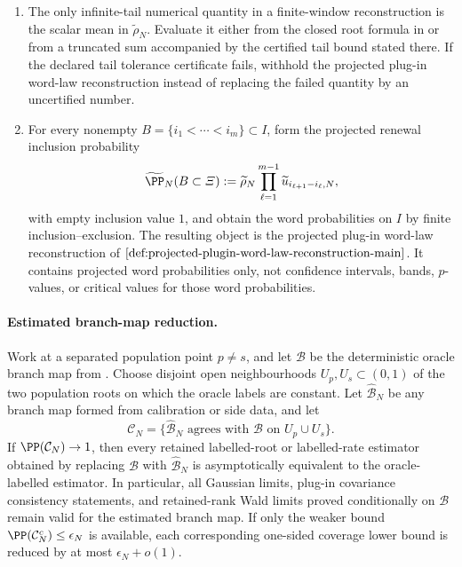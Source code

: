 \begin{enumerate}[label=\textup{\arabic*.},leftmargin=2.0em,itemsep=0.35em]
\item The only infinite-tail numerical quantity in a finite-window
reconstruction is the scalar mean in \(\widetilde\rho_N\).  Evaluate it either from the closed
root formula in
 or from a truncated
sum accompanied by the certified tail bound stated there.  If the declared
tail tolerance certificate fails, withhold the projected plug-in word-law
reconstruction instead of replacing the failed quantity by an uncertified
number.

\item For every nonempty \(B=\{i_1<\cdots<i_m\}\subset I\), form the projected
renewal inclusion probability
\[
\widetilde\PP_N(B\subset\varXi)
:=\widetilde\rho_N
\prod_{\ell=1}^{m-1}\widetilde u_{i_{\ell+1}-i_\ell,N},
\]
with empty inclusion value \(1\), and obtain the word probabilities on \(I\)
by finite inclusion--exclusion.  The resulting object is the projected plug-in
word-law reconstruction of \(\Cref{def:projected-plugin-word-law-reconstruction-main}\).
It contains projected word probabilities only, not confidence intervals, bands,
\(p\)-values, or critical values for those word probabilities.
\end{enumerate}


\paragraph{Estimated branch-map reduction.}\label{app:branch-map-oracle-reduction-main}
Work at a separated population point \(p\ne s\), and let \(\mathcal B\) be the
deterministic oracle branch map from
.  Choose disjoint open
neighbourhoods \(U_p,U_s\subset(0,1)\) of the two population roots on which the
oracle labels are constant.  Let \(\widehat{\mathcal B}_N\) be any branch map
formed from calibration or side data, and let
\[
\mathcal C_N=\{\widehat{\mathcal B}_N
\text{ agrees with }\mathcal B\text{ on }U_p\cup U_s\}.
\]
If \(\PP(\mathcal C_N)\to1\), then every retained labelled-root or
labelled-rate estimator obtained by replacing \(\mathcal B\) with
\(\widehat{\mathcal B}_N\) is asymptotically equivalent to the oracle-labelled
estimator.  In particular, all Gaussian limits, plug-in covariance
consistency statements, and retained-rank Wald limits proved conditionally on
\(\mathcal B\) remain valid for the estimated branch map.  If only the weaker
bound \(\PP(\mathcal C_N^c)\le\epsilon_N\) is available, each corresponding
one-sided coverage lower bound is reduced by at most \(\epsilon_N+o(1)\).

